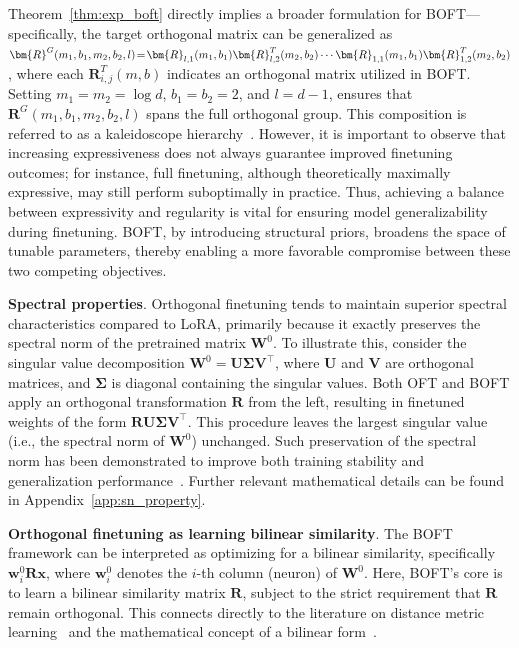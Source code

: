 Theorem~\ref{thm:exp_boft} directly implies a broader formulation for BOFT—specifically, the target orthogonal matrix can be generalized as $\thickmuskip=2mu \medmuskip=2mu \bm{R}^G(m_1,b_1,m_2,b_2,l)=\bm{R}_{l,1}(m_1,b_1)\bm{R}_{l,2}^T(m_2,b_2)\cdots\bm{R}_{1,1}(m_1,b_1)\bm{R}_{1,2}^T(m_2,b_2)$, where each $\bm{R}_{i,j}^T(m,b)$ indicates an orthogonal matrix utilized in BOFT. Setting $m_1=m_2=\log d$, $b_1=b_2=2$, and $l=d-1$, ensures that $\bm{R}^G(m_1,b_1,m_2,b_2,l)$ spans the full orthogonal group. This composition is referred to as a kaleidoscope hierarchy~\cite{dao2019kaleidoscope}. However, it is important to observe that increasing expressiveness does not always guarantee improved finetuning outcomes; for instance, full finetuning, although theoretically maximally expressive, may still perform suboptimally in practice. Thus, achieving a balance between expressivity and regularity is vital for ensuring model generalizability during finetuning. BOFT, by introducing structural priors, broadens the space of tunable parameters, thereby enabling a more favorable compromise between these two competing objectives.

\textbf{Spectral properties}. Orthogonal finetuning tends to maintain superior spectral characteristics compared to LoRA, primarily because it exactly preserves the spectral norm of the pretrained matrix $\bm{W}^0$. To illustrate this, consider the singular value decomposition $\bm{W}^0 = \bm{U} \bm{\Sigma} \bm{V}^\top$, where $\bm{U}$ and $\bm{V}$ are orthogonal matrices, and $\bm{\Sigma}$ is diagonal containing the singular values. Both OFT and BOFT apply an orthogonal transformation $\bm{R}$ from the left, resulting in finetuned weights of the form $\bm{R} \bm{U} \bm{\Sigma} \bm{V}^\top$. This procedure leaves the largest singular value (i.e., the spectral norm of $\bm{W}^0$) unchanged. Such preservation of the spectral norm has been demonstrated to improve both training stability and generalization performance~\cite{miyato2018spectral,yoshida2017spectral}. Further relevant mathematical details can be found in Appendix~\ref{app:sn_property}.

\textbf{Orthogonal finetuning as learning bilinear similarity}. The BOFT framework can be interpreted as optimizing for a bilinear similarity, specifically $\bm{w}^0_i\bm{R}\bm{x}$, where $\bm{w}^0_i$ denotes the $i$-th column (neuron) of $\bm{W}^0$. Here, BOFT's core is to learn a bilinear similarity matrix $\bm{R}$, subject to the strict requirement that $\bm{R}$ remain orthogonal. This connects directly to the literature on distance metric learning~\cite{xing2002distance} and the mathematical concept of a bilinear form~\cite{roman2005advanced}.


